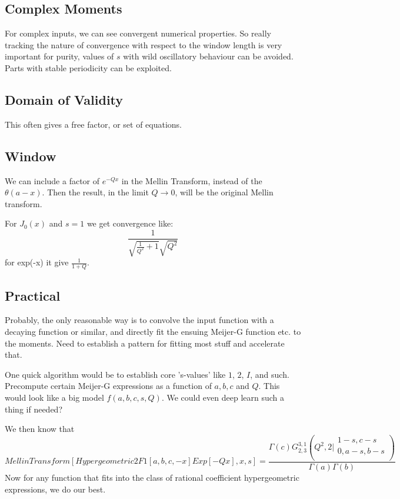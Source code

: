 \documentclass{article}
\begin{document}
\subsection{Complex Moments}
For complex inputs, we can see convergent numerical properties. So really tracking the nature of convergence with respect to the window length is very important for purity, values of $s$ with wild oscillatory behaviour can be avoided. Parts with stable periodicity can be exploited. 


\subsection{Domain of Validity}
This often gives a free factor, or set of equations.

\subsection{Window}
We can include a factor of $e^{-Qx}$ in the Mellin Transform, instead of the $\theta(a-x)$. Then the result, in the limit $Q \to 0$, will be the original Mellin transform.

For $J_0(x)$ and $s=1$ we get convergence like:
$$
\frac{1}{\sqrt{\frac{1}{Q^2}+1} \sqrt{Q^2}}
$$
for exp(-x) it give $\frac{1}{1+Q}$.


\subsection{Practical}
Probably, the only reasonable way is to convolve the input function with a decaying function or similar, and directly fit the ensuing Meijer-G function etc. to the moments. Need to establish a pattern for fitting most stuff and accelerate that.

One quick algorithm would be to establish core 's-values' like $1$, $2$, $I$, and such. Precompute certain Meijer-G expressions as a function of $a,b,c$ and $Q$. This would look like a big model $f(a,b,c,s,Q)$. We could even deep learn such a thing if needed?

We then know that
$$
MellinTransform[Hypergeometric2F1[a,b,c,-x]Exp[- Q x],x,s] = \frac{\Gamma (c) G_{2,3}^{3,1}\left(Q^2,2|
                  \begin{array}{c}
                   1-s,c-s \\
                   0,a-s,b-s \\
                  \end{array}
                  \right)}{\Gamma (a) \Gamma (b)}
$$
Now for any function that fits into the class of rational coefficient hypergeometric expressions, we do our best. 
\end{document}
